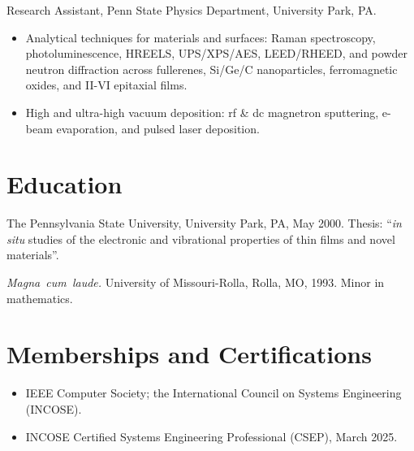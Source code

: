 \documentclass[american]{cv}
\begin{document}
\begin{topic}
\item [1993 - 2000] Research Assistant, Penn State Physics Department,
University Park, PA.

\begin{itemize}
\item Analytical techniques for materials and surfaces: Raman spectroscopy,
photoluminescence, HREELS, UPS/XPS/AES, LEED/RHEED, and powder neutron
diffraction across fullerenes, Si/Ge/C nanoparticles, ferromagnetic oxides,
and II-VI epitaxial films.
\item High and ultra-high vacuum deposition: rf \& dc magnetron sputtering,
e-beam evaporation, and pulsed laser deposition.
\end{itemize}

\end{topic}

\section{Education }

\begin{topic}
\item [Ph.~D.~Physics]The Pennsylvania State University, University Park,
PA, May 2000. Thesis: ``\emph{in situ} studies of the electronic and vibrational
properties of thin films and novel materials''.
\item [B.S.~Physics]\emph{Magna~cum~laude.} University of Missouri-Rolla,
Rolla, MO, 1993. Minor in mathematics.
\end{topic}

\section{Memberships and Certifications }

\begin{itemize}
\item IEEE Computer Society; the International Council on Systems Engineering
(INCOSE).
\item INCOSE Certified Systems Engineering Professional (CSEP), March 2025.
\end{itemize}
\end{document}
